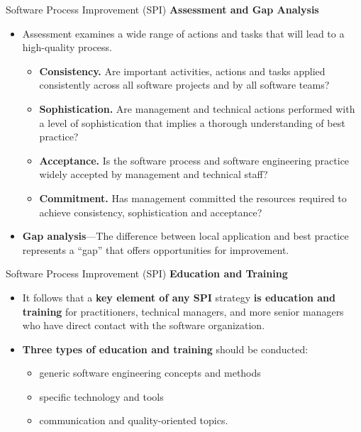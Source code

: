 \documentclass{beamer}
\begin{document}
\begin{frame}{Software Process Improvement (SPI)}
	\textbf{Assessment and Gap Analysis}
	\begin{itemize}
		\item Assessment examines a wide 
		range of actions and tasks that will lead to a high-quality process.
		\begin{itemize}
			\item \textbf{Consistency.} Are important activities, actions and tasks applied consistently across all software projects and by all software teams?
			\item \textbf{Sophistication.} Are management and technical actions 
			performed with a level of sophistication that implies a 
			thorough understanding of best practice?
			\item\textbf{Acceptance.} Is the software process and software engineering 
			practice widely accepted by management and technical staff?
			\item \textbf{Commitment.} Has management committed the resources 
			required to achieve consistency, sophistication and 
			acceptance?
		\end{itemize}
		
		\item \textbf{Gap analysis}—The difference between local application and 
		best practice represents a “gap” that offers opportunities 
		for improvement.
		
	\end{itemize}
\end{frame}
\begin{frame}{Software Process Improvement (SPI)}
	\textbf{Education and Training}
	\begin{itemize}
		\item It follows that a \textbf{key element of any SPI} strategy \textbf{is education and training} for practitioners, technical 
		managers, and more senior managers who have direct contact with the software organization.
		\item \textbf{Three types 
			of education and training} should be conducted:
		\begin{itemize}
			\item generic software engineering concepts and methods
			\item specific technology and tools
			\item communication and quality-oriented topics.
		\end{itemize} 
	\end{itemize}
\end{frame}
\end{document}
